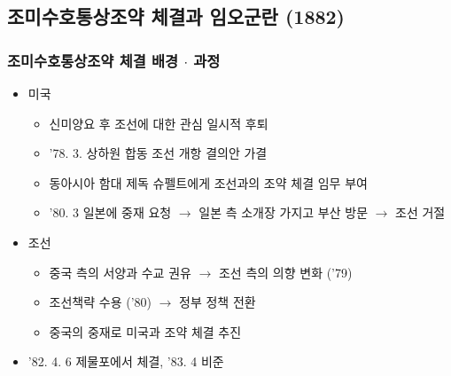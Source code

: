 \subsection{조미수호통상조약 체결과 임오군란 (1882)}

\subsubsection*{조미수호통상조약 체결 배경 $\cdot$ 과정}
\begin{itemize}
    \item 미국
    \begin{itemize}
        \item 신미양요 후 조선에 대한 관심 일시적 후퇴
        \item '78. 3. 상하원 합동 조선 개항 결의안 가결
        \item 동아시아 함대 제독 슈펠트에게 조선과의 조약 체결 임무 부여
        \item '80. 3 일본에 중재 요청 $\rightarrow$ 일본 측 소개장 가지고 부산 방문 $\rightarrow$ 조선 거절
    \end{itemize}
    \newpage
    \item 조선
    \begin{itemize}
        \item 중국 측의 서양과 수교 권유 $\rightarrow$ 조선 측의 의향 변화 ('79)
        \item 조선책략 수용 ('80) $\rightarrow$ 정부 정책 전환
        \item 중국의 중재로 미국과 조약 체결 추진
    \end{itemize}
    \item '82. 4. 6 제물포에서 체결, '83. 4 비준
\end{itemize}

